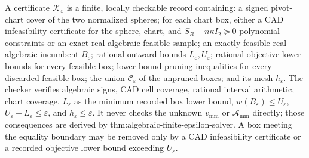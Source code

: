 A certificate \(\mathscr K_{\varepsilon}\) is a finite, locally checkable record containing: a signed pivot-chart cover of the two normalized spheres; for each chart box, either a CAD infeasibility certificate for the sphere, chart, and \(S_B-n\kappa I_2\succeq0\) polynomial constraints or an exact real-algebraic feasible sample; an exactly feasible real-algebraic incumbent \(B_{\varepsilon}\); rational outward bounds \(L_{\varepsilon},U_{\varepsilon}\); rational objective lower bounds for every feasible box; lower-bound pruning inequalities for every discarded feasible box; the union \(\mathcal C_\varepsilon\) of the unpruned boxes; and its mesh \(h_{\varepsilon}\).  The checker verifies algebraic signs, CAD cell coverage, rational interval arithmetic, chart coverage, \(L_{\varepsilon}\) as the minimum recorded box lower bound, \(w(B_{\varepsilon})\le U_{\varepsilon}\), \(U_{\varepsilon}-L_{\varepsilon}\le\varepsilon\), and \(h_{\varepsilon}\le\varepsilon\).  It never checks the unknown \(v_{\mathrm{mm}}\) or \(\mathcal A_{\mathrm{mm}}\) directly; those consequences are derived by thm:algebraic-finite-epsilon-solver.  A box meeting the equality boundary may be removed only by a CAD infeasibility certificate or a recorded objective lower bound exceeding \(U_{\varepsilon}\).